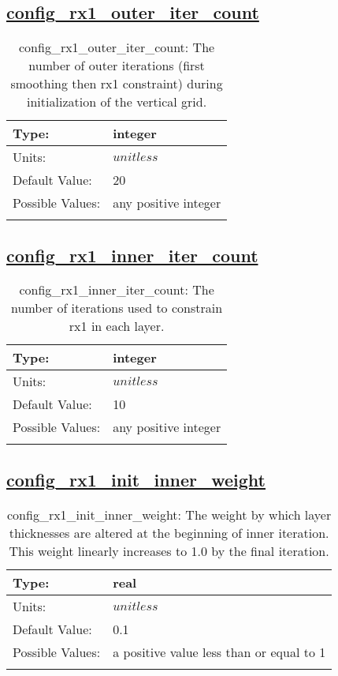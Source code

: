 \subsection[config\_rx1\_outer\_iter\_count]{\hyperref[sec:nm_tab_constrain_Haney_number]{config\_rx1\_outer\_iter\_count}}
\label{subsec:nm_sec_config_rx1_outer_iter_count}
\begin{center}
\begin{longtable}{| p{2.0in} || p{4.0in} |}
    \hline
    Type: & integer \\
    \hline
    Units: & $unitless$ \\
    \hline
    Default Value: & 20 \\
    \hline
    Possible Values: & any positive integer \\
    \hline
    \caption{config\_rx1\_outer\_iter\_count: The number of outer iterations (first smoothing then rx1 constraint) during initialization of the vertical grid.}
\end{longtable}
\end{center}
\subsection[config\_rx1\_inner\_iter\_count]{\hyperref[sec:nm_tab_constrain_Haney_number]{config\_rx1\_inner\_iter\_count}}
\label{subsec:nm_sec_config_rx1_inner_iter_count}
\begin{center}
\begin{longtable}{| p{2.0in} || p{4.0in} |}
    \hline
    Type: & integer \\
    \hline
    Units: & $unitless$ \\
    \hline
    Default Value: & 10 \\
    \hline
    Possible Values: & any positive integer \\
    \hline
    \caption{config\_rx1\_inner\_iter\_count: The number of iterations used to constrain rx1 in each layer.}
\end{longtable}
\end{center}
\subsection[config\_rx1\_init\_inner\_weight]{\hyperref[sec:nm_tab_constrain_Haney_number]{config\_rx1\_init\_inner\_weight}}
\label{subsec:nm_sec_config_rx1_init_inner_weight}
\begin{center}
\begin{longtable}{| p{2.0in} || p{4.0in} |}
    \hline
    Type: & real \\
    \hline
    Units: & $unitless$ \\
    \hline
    Default Value: & 0.1 \\
    \hline
    Possible Values: & a positive value less than or equal to 1 \\
    \hline
    \caption{config\_rx1\_init\_inner\_weight: The weight by which layer thicknesses are altered at the beginning of inner iteration. This weight linearly increases to 1.0 by the final iteration.}
\end{longtable}
\end{center}
